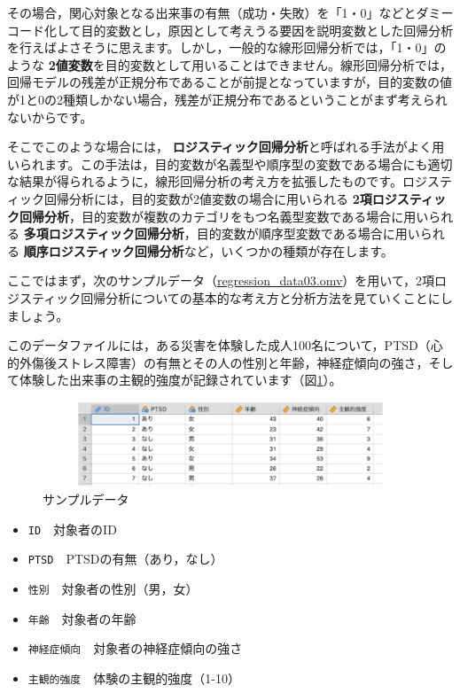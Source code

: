 \documentclass[
  12pt,
  a5jpaper,
  lualatex, ja=standard]{bxjsbook}
\providecommand{\tightlist}{%
  \setlength{\itemsep}{0pt}\setlength{\parskip}{0pt}}
\renewcommand{\emph}[1]{\textbf{\color{emph} #1}}
\newenvironment{jmvvar}{%
	\begin{center}%
	\begin{tcolorbox}[%
		title=変数一覧,
		colframe=daidai,
		colbacktitle=daidai!30!white,
		coltitle=daidai!10!black,
		colback=daidai!2!white,
		breakable,
		width=.9\textwidth
		]\small\addtolength{\leftmargini}{-3\labelsep}%
	}%
	{\end{tcolorbox}\end{center}}
\begin{document}
その場合，関心対象となる出来事の有無（成功・失敗）を「1・0」などとダミーコード化して目的変数とし，原因として考えうる要因を説明変数とした回帰分析を行えばよさそうに思えます。しかし，一般的な線形回帰分析では，「1・0」のような\emph{2値変数}を目的変数として用いることはできません。線形回帰分析では，回帰モデルの残差が正規分布であることが前提となっていますが，目的変数の値が1と0の2種類しかない場合，残差が正規分布であるということがまず考えられないからです。

そこでこのような場合には，\emph{ロジスティック回帰分析}と呼ばれる手法がよく用いられます。この手法は，目的変数が名義型や順序型の変数である場合にも適切な結果が得られるように，線形回帰分析の考え方を拡張したものです。ロジスティック回帰分析には，目的変数が2値変数の場合に用いられる\emph{2項ロジスティック回帰分析}，目的変数が複数のカテゴリをもつ名義型変数である場合に用いられる\emph{多項ロジスティック回帰分析}，目的変数が順序型変数である場合に用いられる\emph{順序ロジスティック回帰分析}など，いくつかの種類が存在します。

ここではまず，次のサンプルデータ（\href{https://github.com/sbtseiji/jmv_compguide/raw/main/data/omv/regression_data03.omv}{regression\_data03.omv}）を用いて，2項ロジスティック回帰分析についての基本的な考え方と分析方法を見ていくことにしましょう。

このデータファイルには，ある災害を体験した成人100名について，PTSD（心的外傷後ストレス障害）の有無とその人の性別と年齢，神経症傾向の強さ，そして体験した出来事の主観的強度が記録されています（図\ref{fig:regression-data03}）。

\begin{figure}[!ht]

{\centering \includegraphics[width=1\linewidth]{images/regression/data03} 

}

\caption{サンプルデータ}\label{fig:regression-data03}
\end{figure}

\begin{jmvvar}

\begin{itemize}
\tightlist
\item
  \texttt{ID}　対象者のID
\item
  \texttt{PTSD}　PTSDの有無（あり，なし）
\item
  \texttt{性別}　対象者の性別（男，女）
\item
  \texttt{年齢}　対象者の年齢
\item
  \texttt{神経症傾向}　対象者の神経症傾向の強さ
\item
  \texttt{主観的強度}　体験の主観的強度（1-10）
\end{itemize}

\end{jmvvar}
\end{document}
